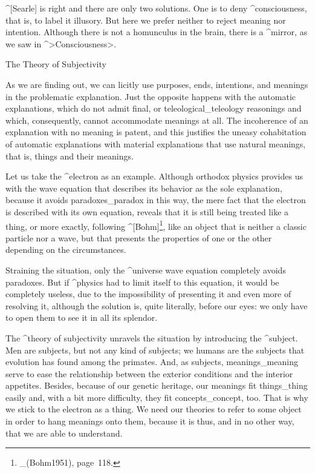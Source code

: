 ^[Searle] is right and there are only two solutions. One is to deny
^{consciousness}, that is, to label it illusory. But here we prefer
neither to reject meaning nor intention. Although there is not a
homunculus in the brain, there is a ^{mirror}, as we saw in
^>Consciousness>.


\Section The Theory of Subjectivity

As we are finding out, we can licitly use purposes, ends, intentions,
and meanings in the problematic explanation. Just the opposite happens
with the automatic explanations, which do not admit final, or
teleological_{teleology} reasonings and which, consequently, cannot
accommodate meanings at all. The incoherence of an explanation with no
meaning is patent, and this justifies the uneasy cohabitation of
automatic explanations with material explanations that use natural
meanings, that is, things and their meanings.

Let us take the ^{electron} as an example. Although orthodox physics
provides us with the wave equation that describes its behavior as the
sole explanation, because it avoids paradoxes_{paradox} in this way, the
mere fact that the electron is described with its own equation, reveals
that it is still being treated like a thing, or more exactly, following
^[Bohm]\footnote{_(Bohm1951), page~118.}, like an object that is neither
a classic particle nor a wave, but that presents the properties of one
or the other depending on the circumstances.

Straining the situation, only the ^{universe} wave equation completely
avoids paradoxes. But if ^{physics} had to limit itself to this
equation, it would be completely useless, due to the impossibility of
presenting it and even more of resolving it, although the solution is,
quite literally, before our eyes: we only have to open them to see it in
all its splendor.

The ^{theory of subjectivity} unravels the situation by introducing the
^{subject}. Men are subjects, but not any kind of subjects; we humans
are the subjects that evolution has found among the primates. And, as
subjects, meanings_{meaning} serve to ease the relationship between the
exterior conditions and the interior appetites. Besides, because of our
genetic heritage, our meanings fit things_{thing} easily and, with a bit
more difficulty, they fit concepts_{concept}, too. That is why we stick
to the electron as a thing. We need our theories to refer to some object
in order to hang meanings onto them, because it is thus, and in no other
way, that we are able to understand.

